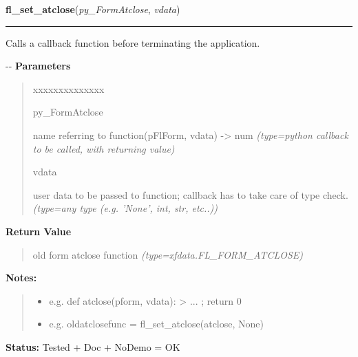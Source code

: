     \label{xformslib:flbasic:fl_set_atclose}

    \vspace{0.5ex}

\hspace{.8\funcindent}\begin{boxedminipage}{\funcwidth}

    \raggedright \textbf{fl\_set\_atclose}(\textit{py\_FormAtclose}, \textit{vdata})

    \vspace{-1.5ex}

    \rule{\textwidth}{0.5\fboxrule}
\setlength{\parskip}{2ex}

Calls a callback function before terminating the application.

-{}-
\setlength{\parskip}{1ex}
      \textbf{Parameters}
      \vspace{-1ex}

      \begin{quote}
        \begin{Ventry}{xxxxxxxxxxxxxx}

          \item[py\_FormAtclose]


name referring to function(pFlForm, vdata) -> num
            {\it (type=python callback to be called, with returning value)}

          \item[vdata]


user data to be passed to function; callback has to take care of
type check.
            {\it (type=any type (e.g. 'None', int, str, etc..))}

        \end{Ventry}

      \end{quote}

      \textbf{Return Value}
    \vspace{-1ex}

      \begin{quote}

old form atclose function
      {\it (type=xfdata.FL\_FORM\_ATCLOSE)}

      \end{quote}

\textbf{Notes:}
\begin{quote}
  \begin{itemize}

  \item
    \setlength{\parskip}{0.6ex}

e.g. def atclose(pform, vdata): > ... ; return 0


  \item 
e.g. oldatclosefunc = fl\_set\_atclose(atclose, None)


\end{itemize}

\end{quote}

\textbf{Status:} 
Tested + Doc + NoDemo = OK


    \end{boxedminipage}


